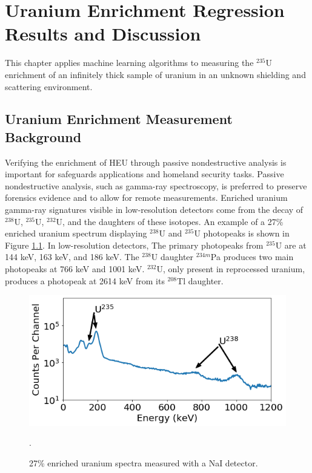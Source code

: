 \chapter{Uranium Enrichment Regression Results and Discussion}





This chapter applies machine learning algorithms to measuring the $^{235}$U enrichment of an infinitely thick sample of uranium in an unknown shielding and scattering environment.

\section{Uranium Enrichment Measurement Background}

Verifying the enrichment of HEU through passive nondestructive analysis is important for safeguards applications and homeland security tasks. Passive nondestructive analysis, such as gamma-ray spectroscopy, is preferred to preserve forensics evidence and to allow for remote measurements. Enriched uranium gamma-ray signatures visible in low-resolution detectors come from the decay of $^{238}$U, $^{235}$U, $^{232}$U, and the daughters of these isotopes. An example of a 27\% enriched uranium spectrum displaying $^{238}$U and $^{235}$U photopeaks is shown in Figure \ref{fig:enriched_u_peaks_displayed}. In low-resolution detectors, The primary photopeaks from $^{235}$U are at 144 keV, 163 keV, and 186 keV. The $^{238}$U daughter $^{234m}$Pa produces two main photopeaks at 766 keV and 1001 keV. $^{232}$U, only present in reprocessed uranium, produces a photopeak at 2614 keV from its $^{208}$Tl daughter.

\begin{figure}[H]
	\centering
	\includegraphics[width=0.8\linewidth]{images/enriched_u_peaks_displayed}
	\caption{27\% enriched uranium spectra measured with a NaI detector.}.
	\label{fig:enriched_u_peaks_displayed}
\end{figure}

